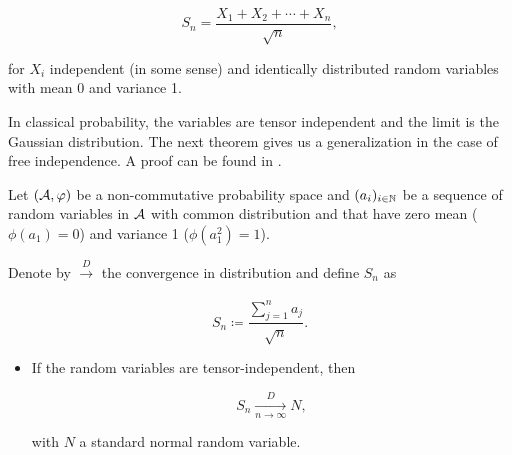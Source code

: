     \[ S_n = \frac{X_1 + X_2 + \cdots + X_n}{\sqrt{n}}, \]

    \noindent for $X_i$ independent (in some sense) and identically distributed random variables with mean 0 and variance 1.

    In classical probability, the variables are tensor independent and the limit is the Gaussian distribution. The next theorem gives us a generalization in the case of free independence. A proof can be found in \cite{book:nica_speicher}.

    \begin{theorem}
        Let $(\mathcal A,\varphi)$ be a non-commutative probability space and $(a_i)_{i\in \mathbb N}$ be a sequence of random variables in $\mathcal A$ with common distribution and that have zero mean ($\phi(a_1)=0$) and variance 1 ($\phi(a_1^2)=1$). 
        
        Denote by $\xrightarrow[]{D}$ the convergence in distribution and define $S_n$ as

        \[ S_n \coloneqq \frac{\sum_{j=1}^n a_j}{\sqrt{n}}.\]
        \begin{itemize}
            \item If the random variables are tensor-independent, then 
                
            \begin{equation*}
            S_n \xrightarrow[n\to\infty]{D} N,        
            \end{equation*}

            \noindent with $N$ a standard normal random variable.
            
            
            

            


\end{itemize}
\end{theorem}
